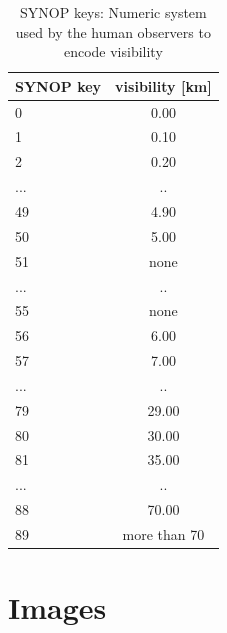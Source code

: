\begin{table}[h]
    \footnotesize
    \centering
        \begin{tabular}{|l|c|}
        \hline
        \textbf{SYNOP key}&\textbf{visibility [km]}\\
        \hline
0	& 0.00\\
\hline
1&	0.10\\
\hline
2 &  0.20\\
\hline
...& ..\\
\hline
49 & 4.90\\
\hline
50&	5.00\\
\hline
51&	none\\
\hline
...& ..\\
\hline
55& none\\
\hline
56&	6.00\\
\hline
57&	7.00\\
\hline
...& ..\\
\hline
79&	29.00\\
\hline
80&	30.00\\
\hline
81&	35.00\\
\hline
...& ..\\
\hline
88&	70.00\\
\hline
89&	more than 70\\
\hline

    \end{tabular}
    \caption{SYNOP keys: Numeric system used by the human observers to encode visibility}
    \label{tab:synoptable}
\end{table}

\chapter{Images}
\label{sec:imagesappendix}
